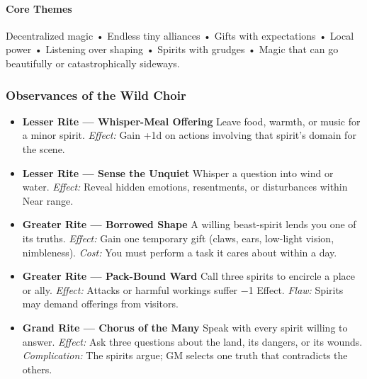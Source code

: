 \documentclass[11pt]{book}
\begin{document}
    \paragraph{Core Themes}
    Decentralized magic • Endless tiny alliances • Gifts with expectations •  
    Local power • Listening over shaping • Spirits with grudges •  
    Magic that can go beautifully or catastrophically sideways.
    
    \subsubsection*{Observances of the Wild Choir}
    
    \begin{itemize}[leftmargin=1.5em]
    
      \item \textbf{Lesser Rite --- Whisper-Meal Offering}  
      Leave food, warmth, or music for a minor spirit.  
      \emph{Effect:} Gain +1d on actions involving that spirit's domain for the scene.
    
      \item \textbf{Lesser Rite --- Sense the Unquiet}  
      Whisper a question into wind or water.  
      \emph{Effect:} Reveal hidden emotions, resentments, or disturbances within Near range.
    
      \item \textbf{Greater Rite --- Borrowed Shape}  
      A willing beast-spirit lends you one of its truths.  
      \emph{Effect:} Gain one temporary gift (claws, ears, low-light vision, nimbleness).  
      \emph{Cost:} You must perform a task it cares about within a day.
    
      \item \textbf{Greater Rite --- Pack-Bound Ward}  
      Call three spirits to encircle a place or ally.  
      \emph{Effect:} Attacks or harmful workings suffer −1 Effect.  
      \emph{Flaw:} Spirits may demand offerings from visitors.
    
      \item \textbf{Grand Rite --- Chorus of the Many}  
      Speak with every spirit willing to answer.  
      \emph{Effect:} Ask three questions about the land, its dangers, or its wounds.  
      \emph{Complication:} The spirits argue; GM selects one truth that contradicts the others.
    
    \end{itemize}
    
\end{document}
